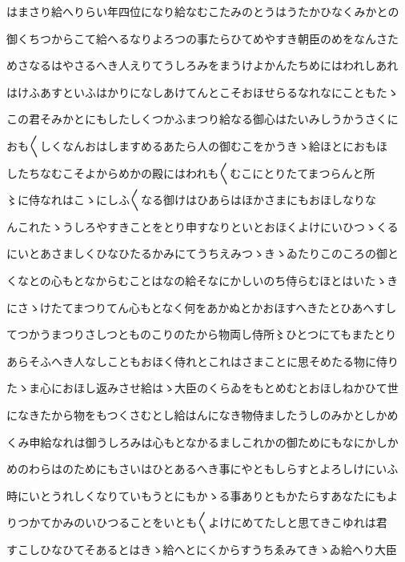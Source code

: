 \documentclass[a4paper,11pt,landscape]{ltjtarticle}
\begin{document}
\par\medskip
はまさり給へりらい年四位になり給なむこたみのとうはうたかひなくみかとの
\par\medskip
御くちつからこて給へるなりよろつの事たらひてめやすき朝臣のめをなんさた
\par\medskip
めさなるはやさるへき人えりてうしろみをまうけよかんたちめにはわれしあれ
\par\medskip
はけふあすといふはかりになしあけてんとこそおほせらるなれなにこともたゝ
\par\medskip
この君そみかとにもしたしくつかふまつり給なる御心はたいみしうかうさくに
\par\medskip
おも〱しくなんおはしますめるあたら人の御むこをかうきゝ給ほとにおもほ
\par\medskip
したちなむこそよからめかの殿にはわれも〱むこにとりたてまつらんと所
\par\medskip
〻に侍なれはこゝにしふ〱なる御けはひあらはほかさまにもおほしなりな
\par\medskip
んこれたゝうしろやすきことをとり申すなりといとおほくよけにいひつゝくる
\par\medskip
にいとあさましくひなひたるかみにてうちえみつゝきゝゐたりこのころの御と
\par\medskip
くなとの心もとなからむことはなの給そなにかしいのち侍らむほとはいたゝき
\par\medskip
にさゝけたてまつりてん心もとなく何をあかぬとかおほすへきたとひあへすし
\par\medskip
てつかうまつりさしつとものこりのたから物両し侍所〻ひとつにてもまたとり
\par\medskip
あらそふへき人なしこともおほく侍れとこれはさまことに思そめたる物に侍り
\par\medskip
たゝま心におほし返みさせ給はゝ大臣のくらゐをもとめむとおほしねかひて世
\par\medskip
になきたから物をもつくさむとし給はんになき物侍ましたうしのみかとしかめ
\par\medskip
くみ申給なれは御うしろみは心もとなかるましこれかの御ためにもなにかしか
\par\medskip
めのわらはのためにもさいはひとあるへき事にやともしらすとよろしけにいふ
\par\medskip
時にいとうれしくなりていもうとにもかゝる事ありともかたらすあなたにもよ
\par\medskip
りつかてかみのいひつることをいとも〱よけにめてたしと思てきこゆれは君
\par\medskip
すこしひなひてそあるとはきゝ給へとにくからすうちゑみてきゝゐ給へり大臣
\par\medskip
\end{document}
